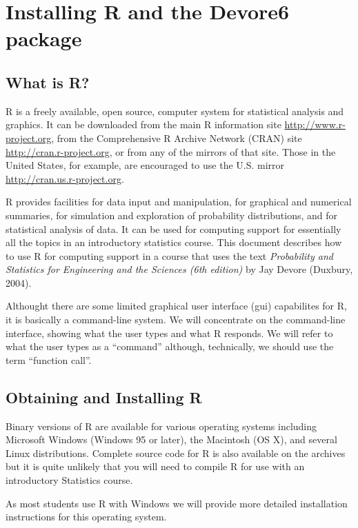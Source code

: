 \documentclass{book}
\begin{document}
\appendix

\chapter{Installing R and the Devore6 package}
\label{app:Installing}

\section{What is R?}
\label{sec:WhatsR}

R is a freely available, open source, computer system for statistical
analysis and graphics.  It can be downloaded from the main R
information site \url{http://www.r-project.org}, from the
Comprehensive R Archive Network (CRAN) site
\url{http://cran.r-project.org}, or from any of the mirrors of that
site.  Those in the United States, for example, are encouraged to use
the U.S. mirror \url{http://cran.us.r-project.org}.

R provides facilities for data input and manipulation, for graphical
and numerical summaries, for simulation and exploration of probability
distributions, and for statistical analysis of data.  It can be used
for computing support for essentially all the topics in an
introductory statistics course.  This document describes how to use R
for computing support in a course that uses the text \emph{Probability
and Statistics for Engineering and the Sciences (6th edition)} by Jay
Devore (Duxbury, 2004).

Althought there are some limited graphical user interface (gui)
capabilites for R, it is basically a command-line system.  We will
concentrate on the command-line interface, showing what the user types
and what R responds.  We will refer to what the user types as a
``command'' although, technically, we should use the term ``function
call''.


\section{Obtaining and Installing R}
\label{sec:GettingR}

Binary versions of R are available for various operating systems
including Microsoft Windows (Windows 95 or later), the Macintosh (OS
X), and several Linux distributions.  Complete source code for R is
also available on the archives but it is quite unlikely that you will
need to compile R for use with an introductory Statistics course.

As most students use R with Windows we will provide more detailed
installation instructions for this operating system.
\end{document}
